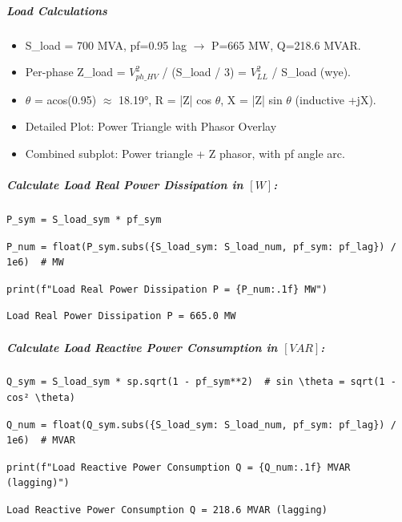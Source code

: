 \subparagraph{Load Calculations}

\begin{itemize}
\item S\_load = 700 MVA, pf=0.95 lag $\to$ P=665 MW, Q=218.6 MVAR.
\item Per-phase Z\_load = $V_{ph\_HV}^2$ / (S\_load / 3) = $V_{LL}^2$ / S\_load (wye).
\item $\theta$ = acos(0.95) $\approx$ 18.19°, R = |Z| cos $\theta$, X = |Z| sin $\theta$ (inductive +jX).
\item Detailed Plot: Power Triangle with Phasor Overlay
\item Combined subplot: Power triangle + Z phasor, with pf angle arc.
\end{itemize}

\subparagraph{Calculate Load Real Power Dissipation in $\left[W\right]$:}

\begin{verbatim}
P_sym = S_load_sym * pf_sym
\end{verbatim}

\begin{verbatim}
P_num = float(P_sym.subs({S_load_sym: S_load_num, pf_sym: pf_lag}) / 1e6)  # MW
\end{verbatim}

\begin{verbatim}
print(f"Load Real Power Dissipation P = {P_num:.1f} MW")
\end{verbatim}

\begin{verbatim}
Load Real Power Dissipation P = 665.0 MW
\end{verbatim}

\subparagraph{Calculate Load Reactive Power Consumption in $\left[VAR\right]$:}

\begin{verbatim}
Q_sym = S_load_sym * sp.sqrt(1 - pf_sym**2)  # sin \theta = sqrt(1 - cos² \theta)
\end{verbatim}

\begin{verbatim}
Q_num = float(Q_sym.subs({S_load_sym: S_load_num, pf_sym: pf_lag}) / 1e6)  # MVAR
\end{verbatim}

\begin{verbatim}
print(f"Load Reactive Power Consumption Q = {Q_num:.1f} MVAR (lagging)")
\end{verbatim}

\begin{verbatim}
Load Reactive Power Consumption Q = 218.6 MVAR (lagging)
\end{verbatim}


